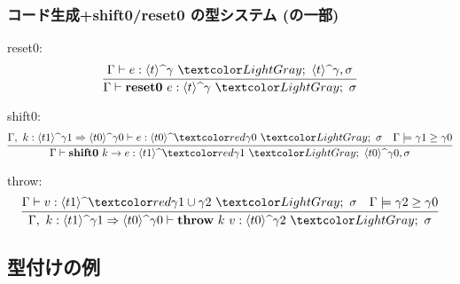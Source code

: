 

\begin{frame}[fragile]
  \frametitle{コード生成+shift0/reset0 の型システム\small{ (の一部)}}
  reset0:
  \[
    \infer{\Gamma \vdash \resetz{e} : \codeTs{t}{\gamma} ~ \lgray{;~ \sigma}}
    {\Gamma \vdash e : \codeTs{t}{\gamma} ~\lgray{;~ \codeTs{t}{\gamma}, \sigma}}
  \]

  shift0:
  \[
    \infer{\Gamma \vdash \shiftz{k}{e} : \codeTs{t1}{\red{\gamma1}} ~\lgray{;~ \codeTs{t0}{\gamma0},\sigma}}
    {\Gamma,~k:\contT{\codeTs{t1}{\gamma1}}{\codeTs{t0}{\gamma0}}
      \vdash e : \codeTs{t0}{\red{\gamma0}} ~\lgray{;~ \sigma}
      & \Gamma \models \gamma1 \ord \gamma0
    }
  \]

  throw:
  \[
    \infer
    {\Gamma,~k:\contT{\codeTs{t1}{\gamma1}}{\codeTs{t0}{\gamma0}}
      \vdash \throw{k}{v} : \codeTs{t0}{\gamma2} ~\lgray{;~ \sigma}}
    {\Gamma
      \vdash v : \codeTs{t1}{\red{\gamma1 \cup \gamma2}} ~\lgray{;~ \sigma}
      & \Gamma \models \gamma2 \ord \gamma0
    }
  \]
\end{frame}

\subsection{型付けの例}

\newcommand\boxterm{\framebox{
    \only<2>{\green{$\cint{3}$}}
    \only<3>{\red{$x~\cPlus~(\cint{3})$}}
    \phantom{A}
  }}

